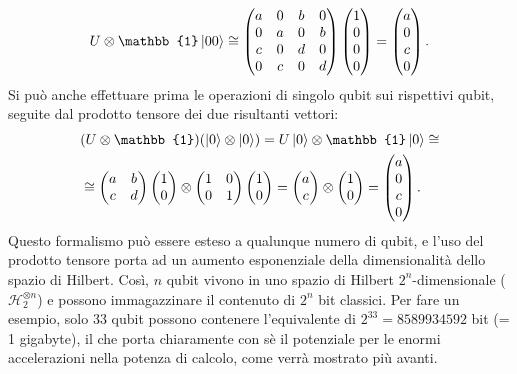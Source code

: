 \begin{equation} \label{eq:2.22}
    U\otimes\mathbb{1}\ket{00}\cong
    \begin{pmatrix}
        a&0&b&0\\
        0&a&0&b\\
        c&0&d&0\\
        0&c&0&d
    \end{pmatrix}
    \begin{pmatrix}
        1\\0\\0\\0
    \end{pmatrix}
    =
    \begin{pmatrix}
        a\\0\\c\\0
    \end{pmatrix}
    .
\end{equation}
Si può anche effettuare prima le operazioni di singolo qubit sui rispettivi 
qubit, seguite dal prodotto tensore dei due risultanti vettori: 
\begin{equation} \label{eq:2.23}
    \begin{split}
    &(U\otimes\mathbb{1})(\ket{0}\otimes\ket{0}) = 
    U\ket{0}\otimes\mathbb{1}\ket{0} \cong \\
    &\cong
    \begin{pmatrix}
        a&b\\c&d
    \end{pmatrix}
    \begin{pmatrix}
        1\\0
    \end{pmatrix}
    \otimes\Id
    \begin{pmatrix}
        1\\0
    \end{pmatrix}
    = 
    \begin{pmatrix}
        a\\c
    \end{pmatrix}
    \otimes
    \begin{pmatrix}
        1\\0
    \end{pmatrix}
    = 
    \begin{pmatrix}
        a\\0\\c\\0
    \end{pmatrix}
    .
    \end{split}
\end{equation}
Questo formalismo può essere esteso a qualunque numero di qubit, e l'uso 
del prodotto tensore porta ad un aumento esponenziale della dimensionalità 
dello spazio di Hilbert. Così, $n$ qubit vivono in uno spazio di Hilbert 
$2^n$-dimensionale ($\mathcal{H}_2^{\otimes n}$) e possono immagazzinare 
il contenuto di $2^n$ bit classici. Per fare un esempio, solo 33 qubit 
possono contenere l'equivalente di $2^33 = 8589934592$ bit %
(= 1 gigabyte), il che porta chiaramente con sè il potenziale per le 
enormi accelerazioni nella potenza di calcolo, come verrà mostrato più avanti. 

